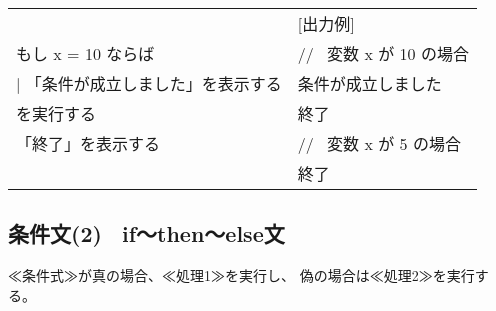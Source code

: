 \documentclass[11pt,a4j]{jarticle}
\begin{document}
\begin{table}[!h]
\hspace{1cm}
\begin{tabular}{l l}
\noindent [使用例] & \hspace{1zw} [出力例] \\
\hspace{1cm} \noindent もし x = 10 ならば & 
\hspace{1cm} // \ 変数 x が 10 の場合 \\
\hspace{1cm} \hspace{1zw} $|$ \hspace{1zw}  「条件が成立しました」を表示する & 
\hspace{1cm} 条件が成立しました \\
\hspace{1cm} を実行する & 
\hspace{1cm} 終了 \\
\hspace{1cm} 「終了」を表示する &
\hspace{1cm} // \ 変数 x が 5 の場合 \\
 &
\hspace{2cm} 終了 \\
\end{tabular}
\end{table}

\vspace{-1.0cm}
\subsection{条件文(2) \ if〜then〜else文}
\begin{quotation}
\end{quotation}

≪条件式≫が真の場合、≪処理1≫を実行し、
偽の場合は≪処理2≫を実行する。
\end{document}
